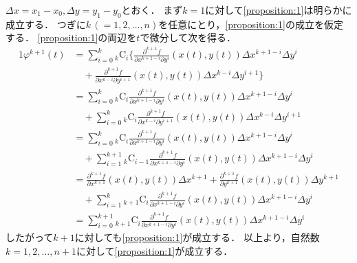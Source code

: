 \documentclass[uplatex]{jsarticle}
\makeatletter
\renewenvironment{proof}[1][\proofname]{\par
        \pushQED{\qed}
        \normalfont
        \topsep6\p@\@plus6\p@ \trivlist
        \item[\hskip\labelsep{\bfseries #1}\@addpunct{\bfseries}]\ignorespaces
    }{%
        \popQED\endtrivlist\@endpefalse
    }
\renewcommand{\proofname}{\underline{証明.}}
\newcommand{\combination}[2]{{}_{#1} \mathrm{C}_{#2}}
\makeatother
\begin{document}
\begin{proof}
    $\Delta x = x_1 - x_0, \Delta y = y_1 - y_0$とおく．
    まず$k=1$に対して\cref{proposition:1}は明らかに成立する．
    つぎに$k\,(=1,2,\dots,n)$を任意にとり，\cref{proposition:1}の成立を仮定する．
    \cref{proposition:1}の両辺を$t$で微分して次を得る．
    \begin{alignat}{1}
        \varphi^{k+1}(t) &= 
            \sum_{i=0}^{k}
                \combination{k}{i}
                \bigg\{
                \frac{\partial^{k+1} f}{\partial x^{k+1-i} \partial y^{i}} (x(t), y(t))
                \Delta x^{k+1-i}
                \Delta y^{i} \nonumber \\
        &\quad +
                \frac{\partial^{k+1} f}{\partial x^{k-i} \partial y^{i+1}} (x(t), y(t))
                \Delta x^{k-i}
                \Delta y^{i+1}
                \bigg\} \\
        &= 
            \sum_{i=0}^{k}
                \combination{k}{i}
                \frac{\partial^{k+1} f}{\partial x^{k+1-i} \partial y^{i}} (x(t), y(t))
                \Delta x^{k+1-i}
                \Delta y^{i} \nonumber \\
        &\quad +
            \sum_{i=0}^{k}
                \combination{k}{i}
                \frac{\partial^{k+1} f}{\partial x^{k-i} \partial y^{i+1}} (x(t), y(t))
                \Delta x^{k-i}
                \Delta y^{i+1} \\
        &= 
            \sum_{i=0}^{k}
                \combination{k}{i}
                \frac{\partial^{k+1} f}{\partial x^{k+1-i} \partial y^{i}} (x(t), y(t))
                \Delta x^{k+1-i}
                \Delta y^{i} \nonumber \\
        &\quad +
            \sum_{i=1}^{k+1}
                \combination{k}{i-1}
                \frac{\partial^{k+1} f}{\partial x^{k+1-i} \partial y^{i}} (x(t), y(t))
                \Delta x^{k+1-i}
                \Delta y^{i} \\
        &= 
            \frac{\partial^{k+1} f}{\partial x^{k+1}} (x(t), y(t))
            \Delta x^{k+1}
            +
            \frac{\partial^{k+1} f}{\partial y^{k+1}} (x(t), y(t))
            \Delta y^{k+1} \nonumber \\
        &\quad +
            \sum_{i=1}^{k}
                \combination{k+1}{i}
                \frac{\partial^{k+1} f}{\partial x^{k+1-i} \partial y^{i}} (x(t), y(t))
                \Delta x^{k+1-i}
                \Delta y^{i} \\
        &=
            \sum_{i=0}^{k+1}
                \combination{k+1}{i}
                \frac{\partial^{k+1} f}{\partial x^{k+1-i} \partial y^{i}} (x(t), y(t))
                \Delta x^{k+1-i}
                \Delta y^{i}
    \end{alignat}
    したがって$k+1$に対しても\cref{proposition:1}が成立する．
    以上より，自然数$k=1,2,\dots,n+1$に対して\cref{proposition:1}が成立する．
\end{proof}
\end{document}
